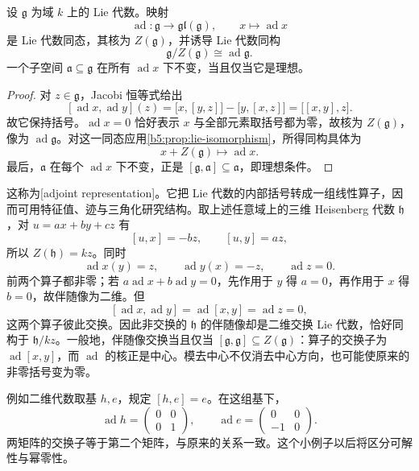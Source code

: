\begin{proposition}\label{b5:prop:adjoint-representation}
	设 \(\mathfrak g\) 为域 \(k\) 上的 Lie 代数。映射
	\[
		\operatorname{ad}:\mathfrak g\longrightarrow\mathfrak{gl}(\mathfrak g), \qquad x\longmapsto\operatorname{ad}x
	\]
	是 Lie 代数同态，其核为 \(Z(\mathfrak g)\)，并诱导 Lie 代数同构
	\[
		\mathfrak g/Z(\mathfrak g)\cong\operatorname{ad}\mathfrak g.
	\]
	一个子空间 \(\mathfrak a\subseteq\mathfrak g\) 在所有 \(\operatorname{ad}x\) 下不变，当且仅当它是理想。
\end{proposition}
\begin{proof}
	对 \(z\in\mathfrak g\)，Jacobi 恒等式给出
	\[
		[\operatorname{ad}x,\operatorname{ad}y](z) =\bigl[x,[y,z]\bigr]-\bigl[y,[x,z]\bigr] =\bigl[[x,y],z\bigr].
	\]
	故它保持括号。\(\operatorname{ad}x=0\) 恰好表示 \(x\) 与全部元素取括号都为零，故核为 \(Z(\mathfrak g)\)，像为 \(\operatorname{ad}\mathfrak g\)。对这一同态应用\cref{b5:prop:lie-isomorphism}，所得同构具体为
	\[
		x+Z(\mathfrak g)\longmapsto\operatorname{ad}x.
	\]
	最后，\(\mathfrak a\) 在每个 \(\operatorname{ad}x\) 下不变，正是 \([\mathfrak g,\mathfrak a]\subseteq\mathfrak a\)，即理想条件。
\end{proof}
这称为[adjoint representation]。它把 Lie 代数的内部括号转成一组线性算子，因而可用特征值、迹与三角化研究结构。取上述任意域上的三维 Heisenberg 代数 \(\mathfrak h\)，对 \(u=ax+by+cz\) 有
\[
	[u,x]=-bz,\qquad [u,y]=az,
\]
所以 \(Z(\mathfrak h)=kz\)。同时
\[
	\operatorname{ad}x(y)=z,\qquad \operatorname{ad}y(x)=-z,\qquad \operatorname{ad}z=0.
\]
前两个算子都非零；若 \(a\operatorname{ad}x+b\operatorname{ad}y=0\)，先作用于 \(y\) 得 \(a=0\)，再作用于 \(x\) 得 \(b=0\)，故伴随像为二维。但
\[
	[\operatorname{ad}x,\operatorname{ad}y] =\operatorname{ad}[x,y]=\operatorname{ad}z=0,
\]
这两个算子彼此交换。因此非交换的 \(\mathfrak h\) 的伴随像却是二维交换 Lie 代数，恰好同构于 \(\mathfrak h/kz\)。一般地，伴随像交换当且仅当 \([\mathfrak g,\mathfrak g]\subseteq Z(\mathfrak g)\)：算子的交换子为 \(\operatorname{ad}[x,y]\)，而 \(\operatorname{ad}\) 的核正是中心。模去中心不仅消去中心方向，也可能使原来的非零括号变为零。

\ProseParagraphBreak

例如二维代数取基 \(h,e\)，规定 \([h,e]=e\)。在这组基下，
\[
	\operatorname{ad}h=\begin{pmatrix}0&0\\0&1\end{pmatrix},
	\qquad
	\operatorname{ad}e=\begin{pmatrix}0&0\\-1&0\end{pmatrix}.
\]
两矩阵的交换子等于第二个矩阵，与原来的关系一致。这个小例子以后将区分可解性与幂零性。
